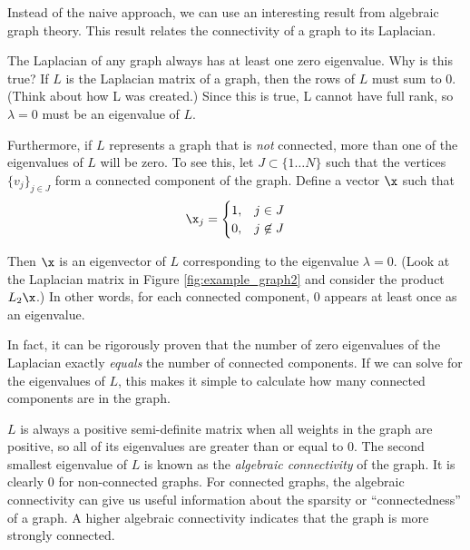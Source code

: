 Instead of the naive approach, we can use an interesting result from algebraic graph theory. 
This result relates the connectivity of a graph to its Laplacian.

The Laplacian of any graph always has at least one zero eigenvalue.
Why is this true?  If $L$ is the Laplacian matrix of a graph, then the rows of $L$ must sum to 0.
(Think about how L was created.)
Since this is true, L cannot have full rank, so $\lambda = 0$ must be an eigenvalue of $L$. 

Furthermore, if $L$ represents a graph that is \textit{not} connected, more than one of the eigenvalues of $L$ will be zero. 
To see this, let $J \subset \{1 \dots N\}$ such that the vertices $\{v_j\}_{j \in J}$ form a connected component of the graph. 
Define a vector $\x$ such that
 \[
    \x_j = \begin{cases}
        1, & j \in J \\
        0, & j \not\in J
        \end{cases}
  \]

Then $\x$ is an eigenvector of $L$ corresponding to the eigenvalue $\lambda = 0$. 
(Look at the Laplacian matrix in Figure \ref{fig:example_graph2} and consider the product $L_2 \x$.) 
In other words, for each connected component, 0 appears at least once as an eigenvalue.

In fact, it can be rigorously proven that the number of zero eigenvalues of the Laplacian exactly \textit{equals} the number of connected components. 
If we can solve for the eigenvalues of $L$, this makes it simple to calculate how many connected components are in the graph.

$L$ is always a positive semi-definite matrix when all weights in the graph are positive, so all of its eigenvalues are greater than or equal to 0.
The second smallest eigenvalue of $L$ is known as the \textit{algebraic connectivity} of the graph.
It is clearly 0 for non-connected graphs.
For connected graphs, the algebraic connectivity can give us useful information about the sparsity or ``connectedness'' of a graph.
A higher algebraic connectivity indicates that the graph is more strongly connected.

\begin{comment}
Thus, it will have real eigenvalues. 
Surprisingly, a graph is connected if the second smallest eigenvalue of its Laplacian matrix is positive.  By second smallest, we mean the second eigenvalue when they are ordered smallest to largest.  The eigenvalues of the Laplacian matrix are never negative; thus, if the second one is not zero, the graph is connected.
In many applications, the Laplacian matrix is sparse, so by taking advantage of this sparsity, we can cheaply determine if a graph is connected.
\end{comment}

